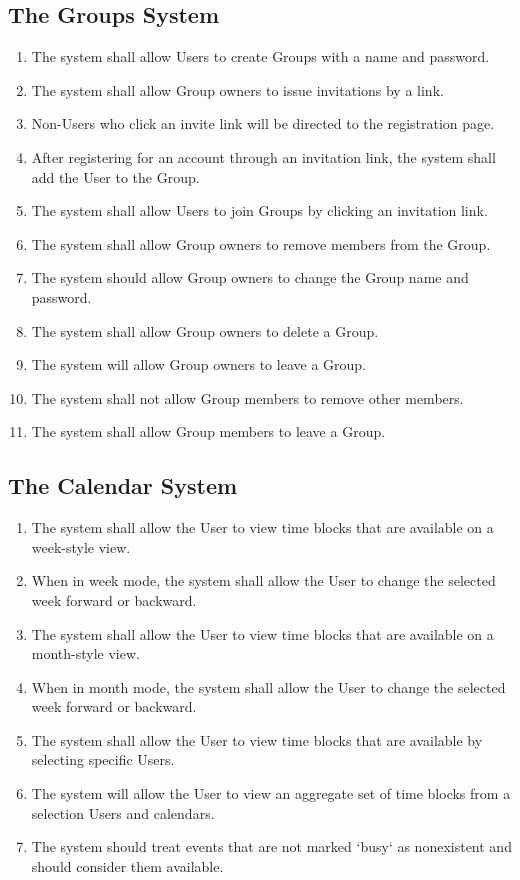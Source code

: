 \documentclass{scrreprt}
\begin{document}
\subsection{The Groups System}
    \begin{enumerate}
    \item The system shall allow Users to create Groups with a name and password.
    \item The system shall allow Group owners to issue invitations by a link.
    \item Non-Users who click an invite link will be directed to the registration page.
    \item After registering for an account through an invitation link, the system shall add the User to the Group.
    \item The system shall allow Users to join Groups by clicking an invitation link.
    \item The system shall allow Group owners to remove members from the Group.
    \item The system should allow Group owners to change the Group name and password.
    \item The system shall allow Group owners to delete a Group.
    \item The system will allow Group owners to leave a Group.
    \item The system shall not allow Group members to remove other members.
    \item The system shall allow Group members to leave a Group.
    \end{enumerate}

\subsection{The Calendar System}
    \begin{enumerate}
    \item The system shall allow the User to view time blocks that are available on a week-style view.
    \item When in week mode, the system shall allow the User to change the selected week forward or backward.
    \item The system shall allow the User to view time blocks that are available on a month-style view.
    \item When in month mode, the system shall allow the User to change the selected week forward or backward.
    \item The system shall allow the User to view time blocks that are available by selecting specific Users.
    \item The system will allow the User to view an aggregate set of time blocks from a selection Users and calendars.
    \item The system should treat events that are not marked `busy` as nonexistent and should consider them available.
    \end{enumerate}
\end{document}
